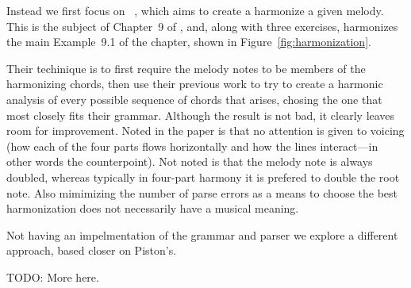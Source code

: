 Instead we first focus on \fharm~\citep{koops-fharm}, which aims to create a
harmonize a given melody. This is the subject of Chapter~9 of 
\citet{piston-harmony}, and, along with three exercises,
\fharm harmonizes the main Example~9.1 of the chapter,
shown in Figure~\ref{fig:harmonization}.

\Harmonization

Their techinique is to first require the melody notes to be members of
the harmonizing chords, then use their previous work to try to
create a harmonic analysis of every possible sequence of chords that
arises, chosing the one that most closely fits their
grammar. Although the result is not bad, it clearly leaves room for
improvement. Noted in the paper is that no attention is given to
voicing (how each of the four parts flows horizontally and how the
lines interact---in other words the counterpoint). Not noted is that
the melody note is always doubled, whereas typically in four-part
harmony it is prefered to double the root note. Also mimimizing the
number of parse errors as a means to choose the best harmonization
does not necessarily have a musical meaning.

Not having an impelmentation of the grammar and parser we explore a
different approach, based closer on Piston's.

TODO: More here.
